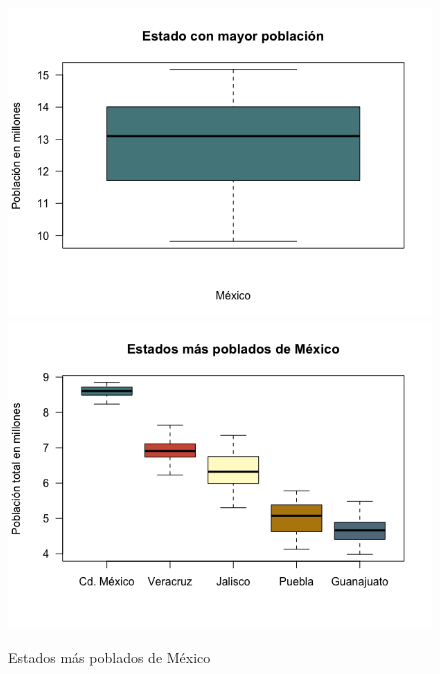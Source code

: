 \documentclass[12pt,letterpaper]{article}
\begin{document}
\begin{figure}[h!]
\centering
\includegraphics[scale=0.42]{mexico.png}
\includegraphics[scale=0.42]{mas-poblados.png}
\caption{Estados más poblados de México}
\label{maspoblados}
\end{figure}
\end{document}
